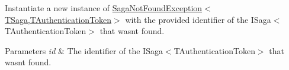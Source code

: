 Instantiate a new instance of \hyperlink{classCqrs_1_1Domain_1_1Exceptions_1_1SagaNotFoundException_a329725b9034ccf3167b667383fb8718a_a329725b9034ccf3167b667383fb8718a}{Saga\+Not\+Found\+Exception$<$\+T\+Saga,\+T\+Authentication\+Token$>$} with the provided identifier of the I\+Saga$<$\+T\+Authentication\+Token$>$ that wasn\textquotesingle{}t found. 


\begin{DoxyParams}{Parameters}
{\em id} & The identifier of the I\+Saga$<$\+T\+Authentication\+Token$>$ that wasn\textquotesingle{}t found.\\
\hline
\end{DoxyParams}
